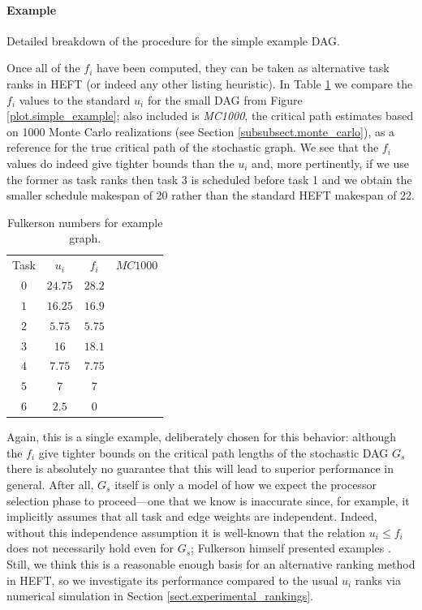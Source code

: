 \documentclass[12pt]{article}
\begin{document}
\paragraph{Example}
\label{para.fulkerson_example}

Detailed breakdown of the procedure for the simple example DAG.

Once all of the $f_i$ have been computed, they can be taken as alternative task ranks in HEFT (or indeed any other listing heuristic). In Table \ref{tb.fulk_example} we compare the $f_i$ values to the standard $u_i$ for the small DAG from Figure \ref{plot.simple_example}; also included is {\em MC1000}, the critical path estimates based on 1000 Monte Carlo realizations (see Section \ref{subsubsect.monte_carlo}), as a reference for the true critical path of the stochastic graph. We see that the $f_i$ values do indeed give tighter bounds than the $u_i$ and, more pertinently, if we use the former as task ranks then task 3 is scheduled before task 1 and we obtain the smaller schedule makespan of 20 rather than the standard HEFT makespan of 22. 

\begin{table}
	\caption{Fulkerson numbers for example graph.} 
	\begin{center}	
		\begin{tabular}{c c c c}
			\cmidrule{1-4}
			Task & $u_i$ & $f_i$ & $MC1000$\\
			\cmidrule{1-4}
			$0$ & $24.75$ & $28.2$ & \\
			$1$ & $16.25$ & $16.9$ & \\
			$2$ & $5.75$ & $5.75$ &\\
			$3$ & $16$ & $18.1$ &\\
			$4$ & $7.75$ & $7.75$ &\\
			$5$ & $7$ & $7$ &\\
			$6$ & $2.5$ & $0$ &\\
			\bottomrule
		\end{tabular}
		\label{tb.fulk_example}
	\end{center}	
\end{table} 

Again, this is a single example, deliberately chosen for this behavior: although the $f_i$ give tighter bounds on the critical path lengths of the stochastic DAG $G_s$ there is absolutely no guarantee that this will lead to superior performance in general. After all, $G_s$ itself is only a model of how we expect the processor selection phase to proceed---one that we know is inaccurate since, for example, it implicitly assumes that all task and edge weights are independent. Indeed, without this independence assumption it is well-known that the relation $u_i \leq f_i$ does not necessarily hold even for $G_s$; Fulkerson himself presented examples \cite{fulk62}. Still, we think this is a reasonable enough basis for an alternative ranking method in HEFT, so we investigate its performance compared to the usual $u_i$ ranks via numerical simulation in Section \ref{sect.experimental_rankings}.
\end{document}
